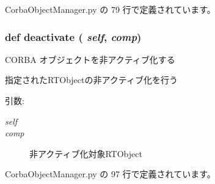  CorbaObjectManager.py の 79 行で定義されています。
\subsubsection{\setlength{\rightskip}{0pt plus 5cm}def deactivate ( {\em self},  {\em comp})}\label{classsource__py_1_1_corba_object_manager_1_1_corba_object_manager_688c91ef5702fb95dad6ab4121119d76}


CORBA オブジェクトを非アクティブ化する 

指定されたRTObjectの非アクティブ化を行う

\begin{Desc}
\item[引数:]
\begin{description}
\item[{\em self}]\item[{\em comp}]非アクティブ化対象RTObject \end{description}
\end{Desc}


 CorbaObjectManager.py の 97 行で定義されています。